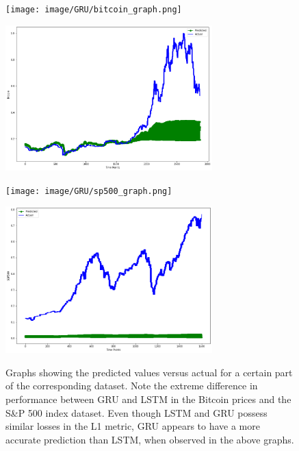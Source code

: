 \documentclass[letterpaper, 10 pt, conference]{ieeeconf}  %
\begin{document}
        \begin{figure}
            \centering
            \begin{minipage}{\columnwidth}
                \centering
                \texttt{[image: image/GRU/bitcoin\_graph.png]}
                \label{label1}
            \end{minipage}%
            \begin{minipage}{\columnwidth}
                \centering
                \includegraphics[width=8cm]{image/LSTM/bitcoin_graph.png}
                \label{label2}
            \end{minipage}
            \begin{minipage}{\columnwidth}
                \centering
                \texttt{[image: image/GRU/sp500\_graph.png]}
                \label{label3}
            \end{minipage}%
            \begin{minipage}{\columnwidth}
                \centering
                \includegraphics[width=8cm]{image/LSTM/sp500_graph.png}
                \label{label4}
            \end{minipage}
            \captionsetup{margin=1.5cm}
            \caption{Graphs showing the predicted values versus actual for a certain part of the corresponding dataset. Note the extreme difference in performance between GRU and LSTM in the Bitcoin prices and the S\&P 500 index dataset. Even though LSTM and GRU possess similar losses in the L1 metric, GRU appears to have a more accurate prediction than LSTM, when observed in the above graphs.}
        \end{figure}
\end{document}
